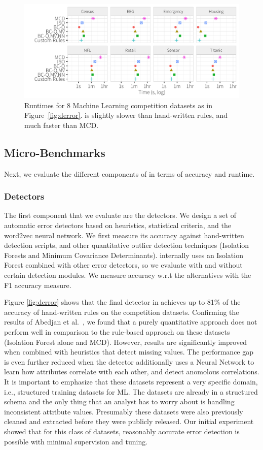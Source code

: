 \begin{figure}[t]
\centering
 \includegraphics[width=\columnwidth]{exp/druntime.png}
 \caption{Runtimes for 8 Machine Learning competition datasets as in Figure~\ref{fig:derror}. \sys is slightly slower than hand-written rules, and much faster than MCD.
 \label{fig:druntime}}
\end{figure}

\subsection{Micro-Benchmarks}
Next, we evaluate the different components of \sys in terms of accuracy and runtime.

\subsubsection{Detectors}
The first component that we evaluate are the detectors. We design a set of automatic error detectors based on heuristics, statistical criteria, and the word2vec neural network. We first measure its accuracy against hand-written detection scripts, and other quantitative outlier detection techniques (Isolation Forests and Minimum Covariance Determinants).
\sys internally uses an Isolation Forest combined with other error detectors, so we evaluate \sys with and without certain detection modules.
We measure accuracy w.r.t the alternatives with the F1 accuracy measure.

 Figure  \ref{fig:derror} shows that the final detector in \sys achieves up to 81\% of the accuracy of hand-written rules on the competition datasets.
Confirming the results of Abedjan et al.~\cite{DBLP:journals/pvldb/AbedjanCDFIOPST16}, we found that a 
purely quantitative approach does not perform well in comparison to the rule-based approach on these datasets (Isolation Forest alone and MCD).
However, results are significantly improved when combined with heuristics that detect missing values. 
The performance gap is even further reduced when the detector additionally uses a Neural Network to learn how attributes correlate with each other, and detect anomolous correlations.
It is important to emphasize that these datasets represent a very specific domain, i.e., structured training datasets for ML.
The datasets are already in a structured schema and the only thing that an analyst has to worry about is handling inconsistent attribute values.
Presumably these datasets were also previously cleaned and extracted before they were publicly released.
Our initial experiment showed that for this class of datasets, reasonably accurate error detection is possible with minimal supervision and tuning.

